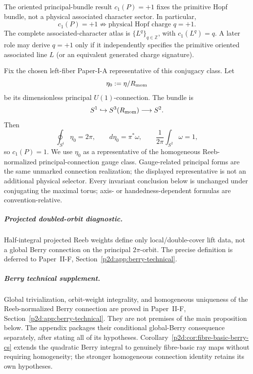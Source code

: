 \documentclass[12pt,a4paper]{article}
\begin{document}
\begin{remark}
The oriented principal-bundle result
\(c_1(P)=+1\) fixes the primitive Hopf bundle, not a physical associated
character sector.  In particular,
\[
 \boxed{c_1(P)=+1\not\Longrightarrow\text{physical Hopf charge }q=+1.}
\]
The complete associated-character atlas is \(\{L^q\}_{q\in\mathbb Z}\), with
\(c_1(L^q)=q\).  A later role may derive \(q=+1\) only if it independently
specifies the primitive oriented associated line \(L\) (or an equivalent
generated charge signature).
\end{remark}

Fix the chosen left-fiber Paper-I-A representative of this conjugacy class.
Let
\[
\eta_0:=\eta/R_{\mathrm{mom}}
\]
be its dimensionless principal \(U(1)\)-connection.  The bundle is
\[
S^1\hookrightarrow S^3(R_{\mathrm{mom}})\longrightarrow S^2.
\]
Then
\begin{equation}
\label{p2:eq:eta0}
\oint_{S^1}\eta_0=2\pi,
\qquad
 d\eta_0=\pi^*\omega,
\qquad
\frac{1}{2\pi}\int_{S^2}\omega = 1,
\end{equation}
so \(c_1(P)=1\).  We use \(\eta_0\) as a representative of the
homogeneous Reeb-normalized principal-connection gauge class.  Gauge-related
principal forms are the same unmarked connection realization; the displayed
representative is not an additional physical selector.  Every invariant
conclusion below is unchanged under conjugating the maximal torus; axis- or
handedness-dependent formulas are convention-relative.


\subparagraph{Projected doubled-orbit diagnostic.}
Half-integral projected Reeb weights define only local/double-cover lift data,
not a global Berry connection on the principal \(2\pi\)-orbit.  The precise
definition is deferred to Paper~II-F, Section~\ref{p2d:app:berry-technical}.

\subparagraph{Berry technical supplement.}
Global trivialization, orbit-weight integrality, and homogeneous uniqueness of
the Reeb-normalized Berry connection are proved in
Paper~II-F, Section~\ref{p2d:app:berry-technical}.  They are not premises of the main
proposition below.  The appendix packages their conditional global-Berry
consequence separately, after stating all of its hypotheses.
Corollary~\ref{p2d:cor:fibre-basic-berry-cs} extends the quadratic Berry
integral to genuinely fibre-basic ray maps without requiring homogeneity;
the stronger homogeneous connection identity retains its own hypotheses.
\end{document}
